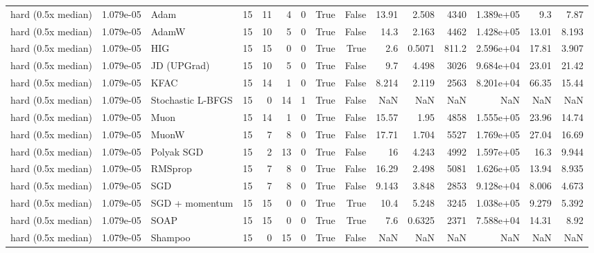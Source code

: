 \begin{tabular}{lrlrrrrrrrrrrrr}
hard (0.5x median) & 1.079e-05 & Adam & 15 & 11 & 4 & 0 & True & False & 13.91 & 2.508 & 4340 & 1.389e+05 & 9.3 & 7.87 \\
hard (0.5x median) & 1.079e-05 & AdamW & 15 & 10 & 5 & 0 & True & False & 14.3 & 2.163 & 4462 & 1.428e+05 & 13.01 & 8.193 \\
hard (0.5x median) & 1.079e-05 & HIG & 15 & 15 & 0 & 0 & True & True & 2.6 & 0.5071 & 811.2 & 2.596e+04 & 17.81 & 3.907 \\
hard (0.5x median) & 1.079e-05 & JD (UPGrad) & 15 & 10 & 5 & 0 & True & False & 9.7 & 4.498 & 3026 & 9.684e+04 & 23.01 & 21.42 \\
hard (0.5x median) & 1.079e-05 & KFAC & 15 & 14 & 1 & 0 & True & False & 8.214 & 2.119 & 2563 & 8.201e+04 & 66.35 & 15.44 \\
hard (0.5x median) & 1.079e-05 & Stochastic L-BFGS & 15 & 0 & 14 & 1 & True & False & NaN & NaN & NaN & NaN & NaN & NaN \\
hard (0.5x median) & 1.079e-05 & Muon & 15 & 14 & 1 & 0 & True & False & 15.57 & 1.95 & 4858 & 1.555e+05 & 23.96 & 14.74 \\
hard (0.5x median) & 1.079e-05 & MuonW & 15 & 7 & 8 & 0 & True & False & 17.71 & 1.704 & 5527 & 1.769e+05 & 27.04 & 16.69 \\
hard (0.5x median) & 1.079e-05 & Polyak SGD & 15 & 2 & 13 & 0 & True & False & 16 & 4.243 & 4992 & 1.597e+05 & 16.3 & 9.944 \\
hard (0.5x median) & 1.079e-05 & RMSprop & 15 & 7 & 8 & 0 & True & False & 16.29 & 2.498 & 5081 & 1.626e+05 & 13.94 & 8.935 \\
hard (0.5x median) & 1.079e-05 & SGD & 15 & 7 & 8 & 0 & True & False & 9.143 & 3.848 & 2853 & 9.128e+04 & 8.006 & 4.673 \\
hard (0.5x median) & 1.079e-05 & SGD + momentum & 15 & 15 & 0 & 0 & True & True & 10.4 & 5.248 & 3245 & 1.038e+05 & 9.279 & 5.392 \\
hard (0.5x median) & 1.079e-05 & SOAP & 15 & 15 & 0 & 0 & True & True & 7.6 & 0.6325 & 2371 & 7.588e+04 & 14.31 & 8.92 \\
hard (0.5x median) & 1.079e-05 & Shampoo & 15 & 0 & 15 & 0 & True & False & NaN & NaN & NaN & NaN & NaN & NaN \\
\bottomrule
\end{tabular}
